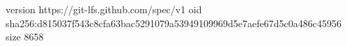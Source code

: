 version https://git-lfs.github.com/spec/v1
oid sha256:d815037f543c8cfa63bac5291079a53949109969d5e7aefe67d5c0a486c45956
size 8658
